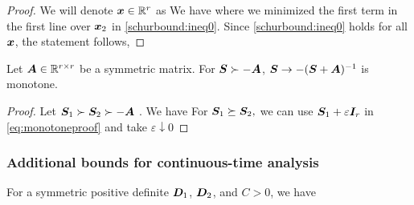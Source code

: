 \begin{proof}
We will denote $\boldsymbol{x} \in \mathbb{R}^r$ as
We have
where we minimized the first term in the first line over $\boldsymbol{x}_2$ in \eqref{schurbound:ineq0}.  Since  \eqref{schurbound:ineq0} holds for all $\boldsymbol{x}$, the statement follows,
\end{proof}

\begin{proposition}
\label{prop:monotonecharac}
Let $\boldsymbol{A} \in \mathbb{R}^{r \times r}$ be a symmetric matrix.  For $\boldsymbol{S} \succ - \boldsymbol{A}$,   $\boldsymbol{S} \to   - (\boldsymbol{S} + \boldsymbol{A})^{-1}$ is monotone.
\end{proposition}

\begin{proof}
Let $\boldsymbol{S}_1 \succ \boldsymbol{S}_2 \succ - \boldsymbol{A}$ . We have
 For  $\boldsymbol{S}_1 \succeq \boldsymbol{S}_2,$ we can use    $\boldsymbol{S}_1 + \varepsilon \boldsymbol{I}_r$  in \eqref{eq:monotoneproof} and take $\varepsilon \downarrow 0$
\end{proof}
\subsubsection{Additional bounds for continuous-time analysis}

\begin{proposition}
\label{prop:offdiagonal}
For a symmetric positive definite $\boldsymbol{D}_1$, $\boldsymbol{D}_2$, and $C > 0$, we have
\end{proposition}

